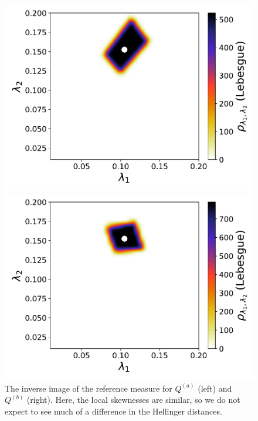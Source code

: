 \begin{figure}[h]
\begin{minipage}{.475\textwidth}
\includegraphics[width=\linewidth]{./images/refheat_pt5Q1_M1N40000_2D_0_1}
\end{minipage}
\begin{minipage}{.475\textwidth}
\includegraphics[width=\linewidth]{./images/refheat_pt5Q2_M1N40000_2D_0_1}
\end{minipage}
\caption{The inverse image of the reference measure for $Q^{(a)}$ (left) and $Q^{(b)}$ (right). Here, the local skewnesses are similar, so we do not expect to see much of a difference in the Hellinger distances.}
\label{fig:NLtopmid}
\end{figure}

